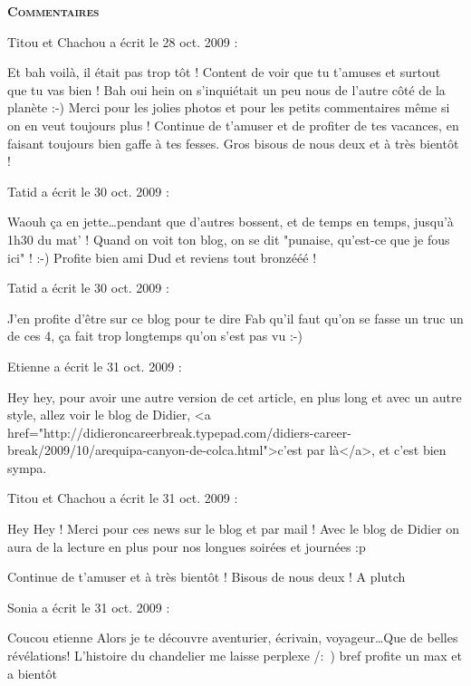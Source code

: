 \bigskip
\textbf{\textsc{Commentaires}}

\medskip
Titou et Chachou a écrit le 28 oct. 2009 :
\begin{displayquote}
Et bah voilà, il était pas trop tôt ! Content de voir que tu t'amuses et surtout que tu vas bien ! Bah oui hein on s'inquiétait un peu nous de l'autre côté de la planète :-)
Merci pour les jolies photos et pour les petits commentaires même si on en veut toujours plus !
Continue de t'amuser et de profiter de tes vacances, en faisant toujours bien gaffe à tes fesses.
Gros bisous de nous deux et à très bientôt !
\end{displayquote}

\medskip
Tatid a écrit le 30 oct. 2009 :
\begin{displayquote}
Waouh ça en jette\dots pendant que d'autres bossent, et de temps en temps, jusqu'à 1h30 du mat' ! Quand on voit ton blog, on se dit "punaise, qu'est-ce que je fous ici" ! :-)
Profite bien ami Dud et reviens tout bronzééé !
\end{displayquote}

\medskip
Tatid a écrit le 30 oct. 2009 :
\begin{displayquote}
J'en profite d'être sur ce blog pour te dire Fab qu'il faut qu'on se fasse un truc un de ces 4, ça fait trop longtemps qu'on s'est pas vu :-)
\end{displayquote}

\medskip
Etienne a écrit le 31 oct. 2009 :
\begin{displayquote}
Hey hey, pour avoir une autre version de cet article, en plus long et avec un autre style, allez voir le blog de Didier, <a href="http://didieroncareerbreak.typepad.com/didiers-career-break/2009/10/arequipa-canyon-de-colca.html">c'est par là</a>, et c'est bien sympa.
\end{displayquote}

\medskip
Titou et Chachou a écrit le 31 oct. 2009 :
\begin{displayquote}
Hey Hey ! Merci pour ces news sur le blog et par mail ! Avec le blog de Didier on aura de la lecture en plus pour nos longues soirées et journées :p

Continue de t'amuser et à très bientôt !
Bisous de nous deux !
A plutch
\end{displayquote}

\medskip
Sonia a écrit le 31 oct. 2009 :
\begin{displayquote}
Coucou etienne
Alors je te découvre aventurier, écrivain, voyageur\dots Que de belles révélations!
L'histoire du chandelier me laisse perplexe /:~)
bref profite un max et a bientôt
\end{displayquote}

